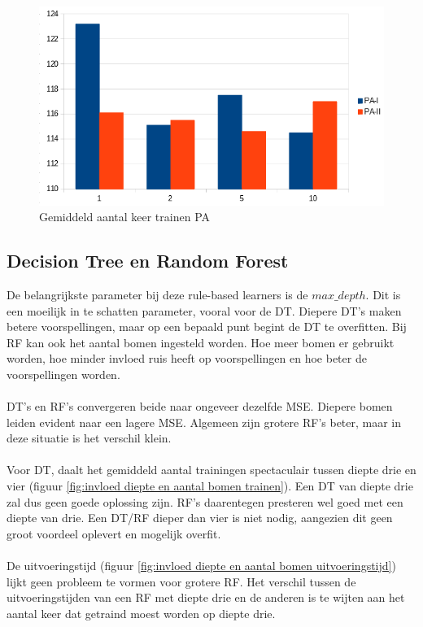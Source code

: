 \newpage
\begin{figure}[t]
	\includegraphics[width=\linewidth]{images/evaluatie/aantalkeertrainenpa.png}
	\caption{Gemiddeld aantal keer trainen PA}
	\label{fig:gemiddeld aantal keer trainen pa}
\end{figure}
\subsection{Decision Tree en Random Forest}
De belangrijkste parameter bij deze rule-based learners is de $max\_ depth$. Dit is een moeilijk in te schatten parameter, vooral voor de DT. Diepere DT’s maken betere voorspellingen, maar op een bepaald punt begint de DT te overfitten. Bij RF kan ook het aantal bomen ingesteld worden. Hoe meer bomen er gebruikt worden, hoe minder invloed ruis heeft op voorspellingen en hoe beter de voorspellingen worden.
\\\\
DT’s en RF’s convergeren beide naar ongeveer dezelfde MSE. Diepere bomen leiden evident naar een lagere MSE. Algemeen zijn grotere RF’s beter, maar in deze situatie is het verschil klein.
\\\\
Voor DT, daalt het gemiddeld aantal trainingen spectaculair tussen diepte drie en vier (figuur \ref{fig:invloed diepte en aantal bomen trainen}). Een DT van diepte drie zal dus geen goede oplossing zijn. RF’s daarentegen presteren wel goed met een diepte van drie. Een DT/RF dieper dan vier is niet nodig, aangezien dit geen groot voordeel oplevert en mogelijk overfit.
\\\\
De uitvoeringstijd (figuur \ref{fig:invloed diepte en aantal bomen uitvoeringstijd}) lijkt geen probleem te vormen voor grotere RF. Het verschil tussen de uitvoeringstijden van een RF met diepte drie en de anderen is te wijten aan het aantal keer dat getraind moest worden op diepte drie.

